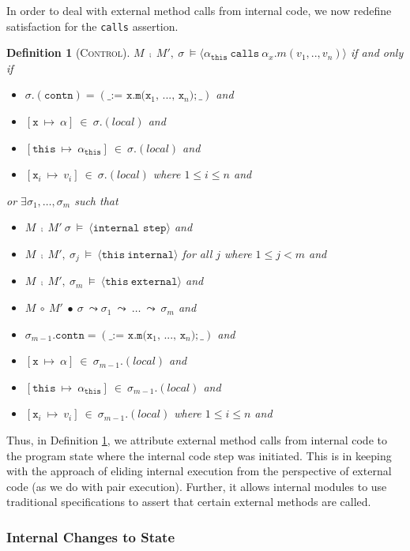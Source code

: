\documentclass[12pt]{article}
\newcommand\calls[4]{\langle #1\ \texttt{calls}\ #2.#3(#4) \rangle}
\newcommand\internal[1]{\langle #1\ \texttt{internal}\rangle}
\newcommand\external[1]{\langle #1\ \texttt{external}\rangle}
\newcommand\internalStep{\langle \texttt{internal step}\rangle}
\newtheorem{definition}{Definition}
\numberwithin{case}{lemma}
\numberwithin{case}{theorem}
\numberwithin{subcase}{case}
\begin{document}
{In order to deal with external method calls from internal code, we 
now redefine satisfaction for the \texttt{calls} assertion.
\begin{definition}[\textsc{Control}]\label{def:control}
$M\ \fcmp\ M',\ \sigma\ \vDash \calls{\alpha_\texttt{this}}{\alpha_x}{m}{v_1, .., v_n}$ if and only if 
\begin{itemize}
\item
$\sigma.(\texttt{contn}) = (\texttt{\_ := x.m(x$_1$, ..., x$_n$)}; \_)$ and
\item
$[\texttt{x}\ \mapsto\ \alpha]\ \in\ \sigma.(local)$ and
\item
$[\texttt{this}\ \mapsto\ \alpha_\texttt{this}]\ \in\ \sigma.(local)$ and
\item
$[\texttt{x}_i\ \mapsto\ v_i]\ \in\ \sigma.(local)$ where $1 \leq i \leq n$ and 
\end{itemize}
or
$\exists \sigma_1, \ldots, \sigma_m$ such that
\begin{itemize}
\item
$M\ \fcmp\ M'\ \sigma\ \vDash\ \internalStep$ and
\item
$M\ \fcmp\ M',\ \sigma_j\ \vDash\ \internal{\texttt{this}}$ for all $j$  where $1 \leq j < m$ and
\item
$M\ \fcmp\ M',\ \sigma_m\ \vDash\ \external{\texttt{this}}$ and
\item
$M\ \circ\ M'\ \bullet\ \sigma\ \leadsto \sigma_1\ \leadsto\ \ldots\ \leadsto\ \sigma_m$ and
\item
$\sigma_{m - 1}.\texttt{contn} = (\texttt{\_ := x.m(x$_1$, ..., x$_n$)}; \_)$ and
\item
$[\texttt{x}\ \mapsto\ \alpha]\ \in\ \sigma_{m - 1}.(local)$ and
\item
$[\texttt{this}\ \mapsto\ \alpha_\texttt{this}]\ \in\ \sigma_{m - 1}.(local)$ and
\item
$[\texttt{x}_i\ \mapsto\ v_i]\ \in\ \sigma_{m - 1}.(local)$ where $1 \leq i \leq n$ and 
\end{itemize}
\end{definition}
\noindent Thus, in Definition \ref{def:control}, we attribute external method calls from internal 
code to the program state where the internal code step was initiated. This is in keeping
with the approach of eliding internal execution from the perspective of external code 
(as we do with pair execution). Further, it allows internal modules to use traditional specifications
to assert that certain external methods are called.

\subsubsection{Internal Changes to State}

}
\end{document}
